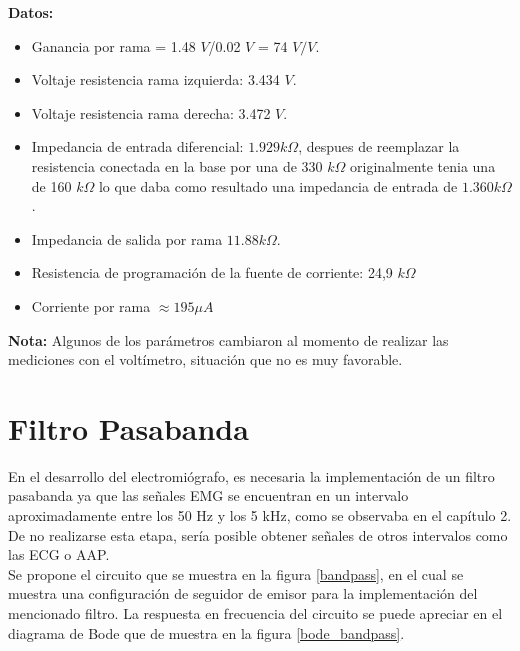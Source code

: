 \textbf{Datos:}
\begin{itemize}
\item Ganancia por rama = 1.48 $V$/0.02 $V$  = 74 $V/V$.
\item Voltaje resistencia rama izquierda: 3.434 $V$.
\item Voltaje resistencia rama derecha: 3.472 $V$.
\item Impedancia de entrada diferencial: $1.929 k\Omega$, despues de reemplazar la resistencia conectada en la base por una de 330 $k\Omega$ originalmente tenia una de 160 $k\Omega$ lo que daba como resultado una impedancia de entrada de $1.360 k\Omega$.
\item Impedancia de salida por rama $11.88 k\Omega$.
\item Resistencia de programación de la fuente de corriente: 24,9 $k\Omega$
\item Corriente por rama $\approx 195 \mu A$
\end{itemize}

\textbf{Nota:} Algunos de los parámetros cambiaron al momento de realizar las mediciones con el voltímetro, situación que no es muy favorable. 








\section{Filtro Pasabanda }

En el desarrollo del electromiógrafo, es necesaria la implementación de un filtro pasabanda ya que las señales EMG se encuentran en un intervalo aproximadamente entre los 50 Hz y los 5 kHz, como se observaba en el capítulo 2. De no realizarse esta etapa, sería posible obtener señales de otros intervalos como las ECG o AAP.\\

Se propone el circuito que se muestra en la figura \ref{bandpass}, en el cual se muestra una configuración de seguidor de emisor para la implementación del mencionado filtro. La respuesta en frecuencia del circuito se puede apreciar en el diagrama de Bode que de muestra en la figura \ref{bode_bandpass}. 

